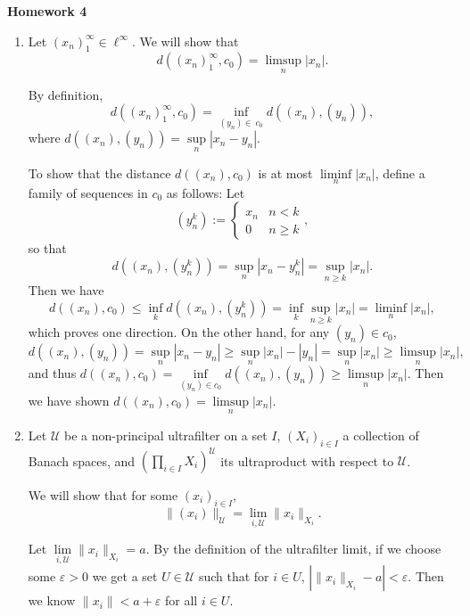 \documentclass[11pt, reqno]{article}
\theoremstyle{plain}
\theoremstyle{definition}
\theoremstyle{remark}
\renewcommand{\epsilon}{\varepsilon}
\begin{document}
\topmargin=-40pt
\renewcommand{\headrulewidth}{1pt}
\renewcommand{\headsep}{20pt}
\thispagestyle{fancy}

{\Huge \bfseries \noindent Homework 4}

\begin{enumerate}
    \item Let $(x_n)_1^\infty \in \ell^\infty$. We will show that 
    \[
        d((x_n)_1^\infty, c_0) = \limsup\limits_n |x_n|.
    \]

    By definition, 
    \[
        d((x_n)_1^\infty, c_0) = \inf\limits_{(y_n) \in\ c_0} d((x_n), (y_n)),
    \]
    where $d\left((x_n), (y_n)\right) = \sup\limits_n |x_n - y_n|$. 
    
    To show that the distance $d((x_n), c_0)$ is at most $\liminf\limits_n |x_n|$, define a family of 
    sequences in $c_0$ as follows: Let 
    \[
        (y_n^k) := \begin{cases}
            x_n & n < k\\
            0   & n \geq k
        \end{cases},
    \]
    so that 
    \[
        d((x_n), (y_n^k)) = \sup\limits_n |x_n - y_n^k| = \sup\limits_{n \geq k} |x_n|.
    \]
    Then we have
    \[
        d((x_n), c_0) \leq \inf\limits_k d((x_n), (y_n^k)) = \inf\limits_k \sup\limits_{n \geq k} |x_n| = \liminf\limits_n |x_n|,
    \]
    which proves one direction. On the other hand, for any $(y_n) \in c_0$, 
    \[
        d((x_n), (y_n)) = \sup\limits_n |x_n - y_n| \geq \sup\limits_n |x_n| - |y_n| = \sup\limits_n |x_n|
        \geq \limsup\limits_n |x_n|,
    \]
    and thus $d((x_n), c_0) = \inf\limits_{(y_n) \in c_0} d((x_n), (y_n)) \geq \limsup\limits_n |x_n|$. 
    Then we have shown $d((x_n), c_0) = \limsup\limits_n |x_n|$.

    \item Let $\mathcal{U}$ be a non-principal ultrafilter on a set $I$, $(X_i)_{i \in I}$ a collection 
    of Banach spaces, and $(\prod_{i \in I} X_i)^{\mathcal{U}}$ its ultraproduct with respect to $\mathcal{U}$.

    We will show that for some $(x_i)_{i \in I}$, 
    \[
        \|(x_i)\|_{\mathcal{U}} = \lim\limits_{i, \mathcal{U}}\|x_i\|_{X_i}.
    \]

    Let $\lim\limits_{i, \mathcal{U}} \|x_i\|_{X_i} = a$. By the definition of the ultrafilter limit, 
    if we choose some $\epsilon > 0$ we get a set $U \in \mathcal{U}$ such that for $i \in U$,
    $|\|x_i\|_{X_i} - a| < \epsilon$. Then we know $\|x_i\| < a + \epsilon$ for all $i \in U$.
    

\end{enumerate}
\end{document}
